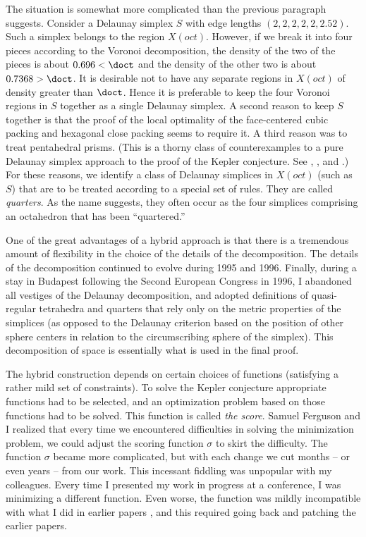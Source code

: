 The situation is somewhat more complicated than the previous
paragraph suggests. Consider a Delaunay simplex $S$ with edge
lengths $(2,2,2,2,2,2.52)$. Such a simplex belongs to the region
$X(oct)$. However, if we break it into four pieces according to
the Voronoi decomposition, the density of the two of the pieces is
about $0.696<\doct$ and the density of the other two is about
$0.7368>\doct$. It is desirable not to have any separate regions
in $X(oct)$ of density greater than $\doct$.  Hence it is
preferable to keep the four Voronoi regions in $S$ together as a
single Delaunay simplex.  A second reason to keep $S$ together is
that the proof of the local optimality of the face-centered cubic
packing and hexagonal close packing seems to require it.  A third
reason was to treat pentahedral prisms.  (This is a thorny class
of counterexamples to a pure Delaunay simplex approach to the
proof of the Kepler conjecture.  See \cite{spp}, \cite{remarks},
and \cite{Fer97}.)  For these reasons, we identify a class of
Delaunay simplices in $X(oct)$ (such as $S$) that are to be
treated according to a special set of rules. They are called {\it
quarters}.  As the name suggests, they often occur as the four
simplices comprising an octahedron that has been ``quartered.''

One of the great advantages of a hybrid approach is that there is
a tremendous amount of flexibility in the choice of the details of
the decomposition.  The details of the decomposition continued to
evolve during 1995 and 1996.  Finally, during a stay in Budapest
following the Second European Congress in 1996, I abandoned all
vestiges of the Delaunay decomposition, and adopted definitions of
quasi-regular tetrahedra and quarters that rely only on the metric
properties of the simplices (as opposed to the Delaunay criterion
based on the position of other sphere centers in relation to the
circumscribing sphere of the simplex).  This decomposition of
space is essentially what is used in the final proof.

The hybrid construction depends on certain choices of functions
(satisfying a rather mild set of constraints).  To solve the
Kepler conjecture appropriate functions had to be selected, and an
optimization problem based on those functions had to be solved.
This function is called {\it the score}.  Samuel Ferguson and I
realized that every time we encountered difficulties in solving
the minimization problem, we could adjust the scoring function
$\sigma$ to skirt the difficulty.  The function $\sigma$ became
more complicated, but with each change we cut months -- or even
years -- from our work.  This incessant fiddling was unpopular
with my colleagues.  Every time I presented my work in progress at
a conference, I was minimizing a different function.  Even worse,
the function was mildly incompatible with what I did in earlier
papers \cite{part1} \cite{part2}, and this required going back and
patching the earlier papers.

